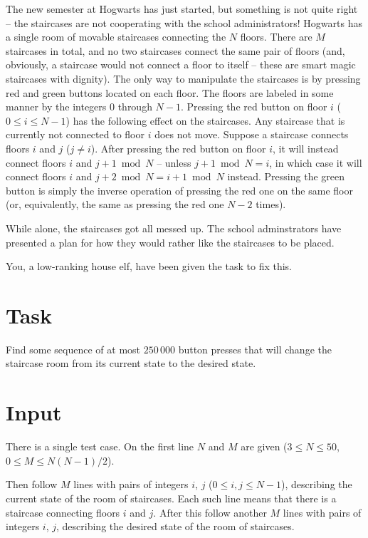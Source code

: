 


The new semester at Hogwarts has just started, but something is not quite right -- the staircases are not cooperating with the school administrators!
Hogwarts has a single room of movable staircases connecting the $N$ floors.
There are $M$ staircases in total, and no two staircases connect the same pair of floors (and,
obviously, a staircase would not connect a floor to itself -- these are smart magic staircases with dignity).
The only way to manipulate the staircases is by pressing red and green buttons located on each floor.
The floors are labeled in some manner by the integers $0$ through $N-1$.
Pressing the red button on floor $i$ ($0\leq i \leq N-1$) has the following effect on the staircases.
Any staircase that is currently not connected to floor $i$ does not move. Suppose a staircase
connects floors $i$ and $j$ ($j \neq i$). After pressing the red button on floor $i$, it will
instead connect floors $i$ and $j+1 \bmod N$ -- unless $j+1\bmod N = i$, in which case it will connect floors $i$ and $j+2 \bmod N =i+1 \bmod N$ instead.
Pressing the green button is simply the inverse operation of pressing the red one on the same floor (or, equivalently, the same as pressing the red one $N-2$ times).

While alone, the staircases got all messed up. The school adminstrators have presented a plan for how they would rather like the staircases to be placed.

You, a low-ranking house elf, have been given the task to fix this.

\section*{Task}
Find some sequence of at most $250\,000$ button presses that will change the staircase room from its
current state to the desired state.

\section*{Input}

There is a single test case. On the first line $N$ and $M$ are given ($3 \leq N \leq 50$, $0 \leq M \leq N(N-1)/2$).

Then follow $M$ lines with pairs of integers $i$, $j$ ($0 \leq i,j\leq N-1$), describing the current
state of the room of staircases. Each such line means that there is a staircase connecting floors
$i$ and $j$. After this follow another $M$ lines with pairs of integers $i$, $j$, describing the
desired state of the room of staircases.

